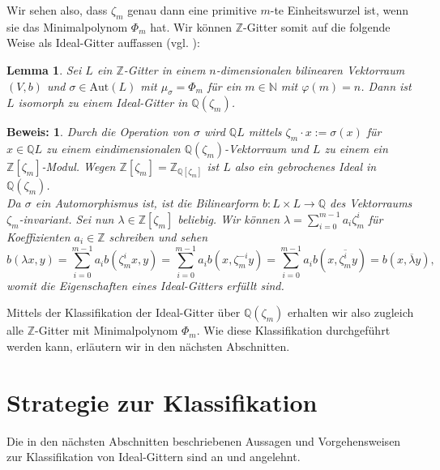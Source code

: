 \documentclass[12pt,a4paper,halfparskip,headsepline,bibtotocnumbered]{scrreprt}
\theoremstyle{nummermitklammern}
\newtheorem{lemma}[defsatzusw]{Lemma}
\theoremstyle{nonumberbreak}
\newtheorem{beweis}{Beweis:}
\newcommand{\N}{\mathbb{N}}
\newcommand{\Z}{\mathbb{Z}}
\newcommand{\Q}{\mathbb{Q}}
\newcommand{\Aut}{\text{Aut}}
\begin{document}
Wir sehen also, dass $\zeta_m$ genau dann eine primitive $m$-te Einheitswurzel ist, wenn sie das Minimalpolynom $\Phi_m$ hat. Wir können $\Z$-Gitter somit auf die folgende Weise als Ideal-Gitter auffassen (vgl. \cite[Abschnitt (5.2)]{nebe}):

\begin{framed}
	\begin{lemma}\label{lem:ztoid}
		Sei $L$ ein $\Z$-Gitter in einem $n$-dimensionalen bilinearen Vektorraum $(V,b)$ und $\sigma \in \Aut(L)$ mit $\mu_\sigma = \Phi_m$ für ein $m \in \N$ mit $\varphi(m) = n$. Dann ist $L$ isomorph zu einem Ideal-Gitter in $\Q \left( \zeta_m \right)$.
	\end{lemma}
\end{framed}

\begin{beweis}
	Durch die Operation von $\sigma$ wird $\Q L$ mittels $\zeta_m \cdot x := \sigma(x)$ für $x \in \Q L$ zu einem eindimensionalen $\Q \left( \zeta_m \right)$-Vektorraum und $L$ zu einem ein $\Z \left[ \zeta_m \right]$-Modul. Wegen $\Z \left[ \zeta_m \right] = \Z_{\Q\left[\zeta_m \right]}$ ist $L$ also ein gebrochenes Ideal in $\Q \left( \zeta_m \right)$.\\
	Da $\sigma$ ein Automorphismus ist, ist die Bilinearform $b:L \times L \rightarrow \Q$ des Vektorraums $\zeta_m$-invariant. Sei nun $\lambda \in \Z \left[ \zeta_m \right]$ beliebig. Wir können $\lambda = \sum_{i=0}^{m-1} a_i \zeta_m^i $ für Koeffizienten $a_i \in \Z$ schreiben und sehen
	\begin{equation*}
		b(\lambda x, y) = \sum_{i=0}^{m-1} a_i b(\zeta_m^i x, y) = \sum_{i=0}^{m-1} a_i b(x, \zeta_m^{-i} y) = \sum_{i=0}^{m-1} a_i b(x, \overline{\zeta_m^i} y) = b(x, \overline{\lambda} y),
	\end{equation*}
	womit die Eigenschaften eines Ideal-Gitters erfüllt sind.
\end{beweis}

Mittels der Klassifikation der Ideal-Gitter über $\Q(\zeta_m)$ erhalten wir also zugleich alle  $\Z$-Gitter mit Minimalpolynom $\Phi_m$. Wie diese Klassifikation durchgeführt werden kann, erläutern wir in den nächsten Abschnitten.

\section{Strategie zur Klassifikation}

Die in den nächsten Abschnitten beschriebenen Aussagen und Vorgehensweisen zur Klassifikation von Ideal-Gittern sind an \cite[Abschnitt (3.2)]{juergens} und \cite[Abschnitt (5.2)]{nebe} angelehnt.
\end{document}
